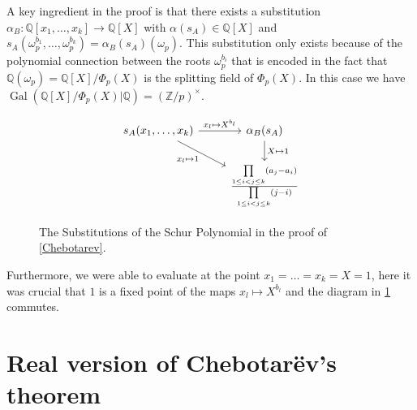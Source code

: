 \documentclass[a4paper]{article}
\renewcommand{\o}{\omega}
\newcommand{\Z}{\ensuremath{\mathbb{Z}}}
\newcommand{\Q}{\ensuremath{\mathbb{Q}}}
\numberwithin{equation}{section}
\numberwithin{table}{section}
\numberwithin{figure}{section}
\begin{document}
A key ingredient in the proof is that there exists a  substitution $\alpha_B \colon \Q[x_1,\ldots,x_k] \to \Q[X]$ with $\alpha(s_A) \in \Q[X]$ and $s_A(\o_p^{b_1},\ldots,\o_p^{b_k})=\alpha_B(s_A)(\o_p)$. This substitution only exists because of the polynomial connection between the roots $\o_p^{b_i}$ that is encoded in the fact that $\Q(\o_p)=\Q[X]/\Phi_p(X)$ is the splitting field of $\Phi_p(X)$.
In this case we have $\operatorname{Gal}(\Q[X]/\Phi_p(X)|\Q)=(\Z/p)^\times$.
\begin{figure}[ht]
    \centering
        \[\begin{tikzcd}
            s_A(x_1,\ldots,x_k) \arrow{r}{x_l\mapsto X^{b_l}}\arrow[swap]{dr}{x_l \mapsto 1}  &    \alpha_B(s_A) \arrow{d}{X \mapsto 1} \\
             & \frac{\prod\limits_{1\leq i < j \leq k}(a_j-a_i)}{\prod\limits_{1\leq i < j \leq k}(j-i)}
            \end{tikzcd}
        \]
    \caption{The Substitutions of the Schur Polynomial in the proof of \cref{Chebotarev}.}
    \label{CommutingSchurDiagramm}
\end{figure}
Furthermore, we were able to evaluate at the point $x_1=\ldots=x_k=X=1$, here it was crucial that $1$ is a fixed point of the maps $x_l \mapsto X^{b_l}$ and the diagram in  \cref{CommutingSchurDiagramm} commutes.



\section{Real version of Chebotar\"ev's theorem}\label{sect:real}
\end{document}
